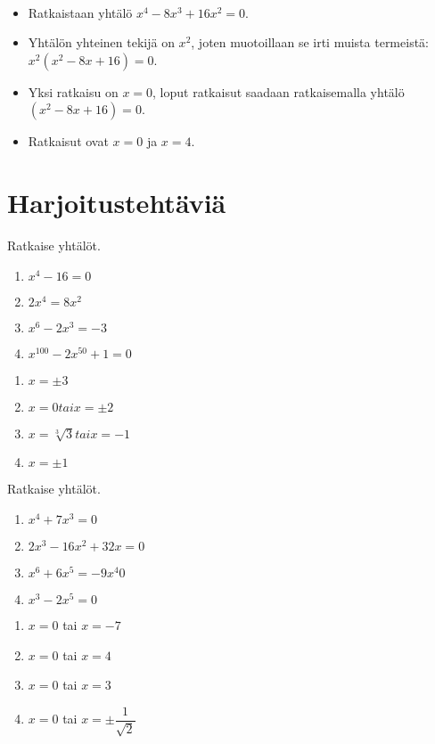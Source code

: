 \begin{esimerkki}{\ }
\begin{itemize}
    \item Ratkaistaan yhtälö $x^4-8x^3+16x^2=0$.
    \item Yhtälön yhteinen tekijä on $x^2$, joten muotoillaan se irti muista termeistä: $x^2(x^2-8x+16)=0$.
    \item Yksi ratkaisu on $x=0$, loput ratkaisut saadaan ratkaisemalla yhtälö $(x^2-8x+16)=0$.
    \item Ratkaisut ovat $x=0$ ja $x=4$.

\end{itemize}
\end{esimerkki}

\section{Harjoitustehtäviä}

\begin{tehtava}
    Ratkaise yhtälöt.
    \begin{enumerate}
        \item $x^4 - 16 = 0$
        \item $2x^4 = 8x^2$
        \item $x^6 - 2x^3 = -3$
        \item $x^{100} - 2x^{50} + 1 = 0$
    \end{enumerate}
    \begin{vastaus}
        \begin{enumerate}
            \item $x = \pm3$
            \item $x= 0 tai x=\pm2$
            \item $x = \sqrt[3]{3} tai x= -1$
            \item $x = \pm1$
        \end{enumerate}
    \end{vastaus}
\end{tehtava}

\begin{tehtava}
    Ratkaise yhtälöt.
    \begin{enumerate}
        \item $x^4 + 7x^3 = 0$
        \item $2x^3 - 16x^2 + 32x = 0$
        \item $x^6 + 6x^5 = -9x^4 0$
        \item $x^3 - 2x^5 = 0$      
    \end{enumerate}
    \begin{vastaus}
        \begin{enumerate}
        	\item $x = 0$ tai $x = -7$
        	\item $x = 0$ tai $x = 4$
        	\item $x = 0$ tai $x = 3$
            \item $x = 0$ tai $x = \pm\dfrac{1}{\sqrt{2}}$
        \end{enumerate}
    \end{vastaus}
\end{tehtava}

